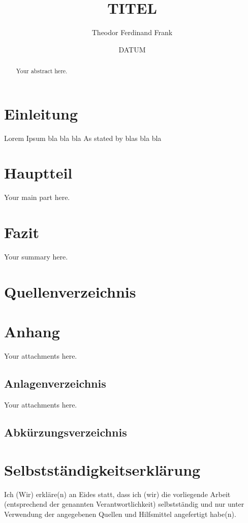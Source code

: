 \documentclass[12pt,a4paper]{article}
\title{TITEL} %
\author{Theodor Ferdinand Frank}
\date{DATUM} %
\begin{document}
%

\begin{abstract}
Your abstract here.
\end{abstract}

\newpage
\tableofcontents
\newpage

\section{Einleitung}
Lorem Ipsum bla\autocite{Dud14} bla bla As stated by %
blas bla bla

\section{Hauptteil}
Your main part here.

\section{Fazit}
Your summary here.


\newpage
\section{Quellenverzeichnis}


\printbibliography
\newpage

\section{Anhang}
Your attachments here.

\subsection{Anlagenverzeichnis}
Your attachments here.

\subsection{Abkürzungsverzeichnis}


\newpage
\section{Selbstständigkeitserklärung}

Ich (Wir) erkläre(n) an Eides statt, dass ich (wir) die vorliegende Arbeit (entsprechend der genannten Verantwortlichkeit) selbstständig und nur unter Verwendung der angegebenen Quellen und Hilfsmittel angefertigt habe(n). 
\medskip
\end{document}
